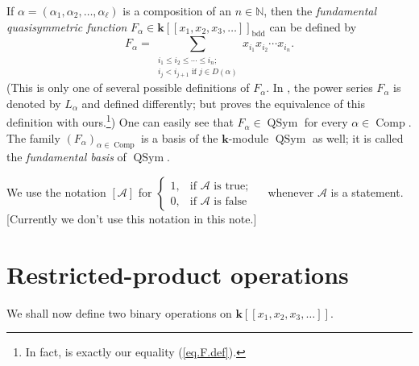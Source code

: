 \documentclass[numbers=enddot,12pt,final,onecolumn,notitlepage,abstracton]{scrartcl}%
\theoremstyle{definition}
\newenvironment{noncompile}{}{}
\let\sumnonlimits\sum
\renewcommand{\sum}{\sumnonlimits\limits}
\begin{document}
If $\alpha=\left(  \alpha_{1},\alpha_{2},\ldots,\alpha_{\ell}\right)  $ is a
composition of an $n\in\mathbb{N}$, then the \textit{fundamental
quasisymmetric function }$F_{\alpha}\in\mathbf{k}\left[  \left[  x_{1}%
,x_{2},x_{3},\ldots\right]  \right]  _{\operatorname*{bdd}}$ can be defined by%
\begin{equation}
F_{\alpha}=\sum_{\substack{i_{1}\leq i_{2}\leq\cdots\leq i_{n};\\i_{j}%
<i_{j+1}\text{ if }j\in D\left(  \alpha\right)  }}x_{i_{1}}x_{i_{2}}\cdots
x_{i_{n}}. \label{eq.F.def}%
\end{equation}
(This is only one of several possible definitions of $F_{\alpha}$. In
\cite[Definition 5.2.4]{Reiner}, the power series $F_{\alpha}$ is denoted by
$L_{\alpha}$ and defined differently; but \cite[Proposition 5.2.9]{Reiner}
proves the equivalence of this definition with ours.\footnote{In fact,
\cite[(5.2.3)]{Reiner} is exactly our equality (\ref{eq.F.def}).}) One can
easily see that $F_{\alpha}\in\operatorname*{QSym}$ for every $\alpha
\in\operatorname*{Comp}$. The family $\left(  F_{\alpha}\right)  _{\alpha
\in\operatorname*{Comp}}$ is a basis of the $\mathbf{k}$-module
$\operatorname*{QSym}$ as well; it is called the \textit{fundamental basis} of
$\operatorname*{QSym}$.

\begin{noncompile}
We use the notation $\left[  \mathcal{A}\right]  $ for $%
\begin{cases}
1, & \text{if }\mathcal{A}\text{ is true;}\\
0, & \text{if }\mathcal{A}\text{ is false}%
\end{cases}
\quad$ whenever $\mathcal{A}$ is a statement. [Currently we don't use this
notation in this note.]
\end{noncompile}

\section{\label{sect.dendri}Restricted-product operations}

We shall now define two binary operations on $\mathbf{k}\left[  \left[
x_{1},x_{2},x_{3},\ldots\right]  \right]  $.
\end{document}
